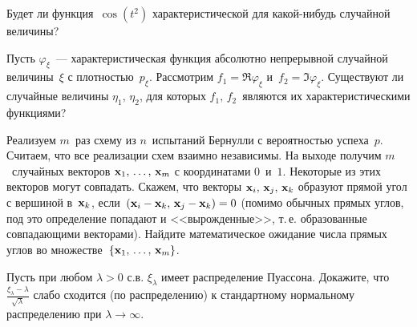 \begin{comment}
\begin{ordre}
Характеристическая функция обладает следующими свойствами:
\begin{fixme}
Iterate the properties 
\end{fixme}
\end{ordre}
\end{comment}


\begin{problem}
Будет ли функция~$\cos(t^2)$ характеристической для какой-нибудь случайной величины?
\end{problem}

\begin{problem}
Пусть $\varphi_{\xi}$~--- характеристическая функция абсолютно непрерывной случайной величины~$\xi$ с плотностью~$p_{\xi}$. Рассмотрим $f_1 = \Re \varphi_{\xi}$ и~$f_2 = \Im \varphi_{\xi} $. Существуют ли случайные величины $\eta_1,\,\eta_2$, для которых $f_1,\,f_2$~являются их характеристическими функциями? 
\end{problem}



\begin{problem}
Реализуем $m$~раз схему из $n$~испытаний Бернулли с вероятностью успеха~$p$. Считаем, что все реализации схем взаимно независимы. На выходе получим $m$~случайных векторов ${\bf x}_1,\,\dots,\,{\bf x}_m$ с координатами $0$~и~$1$. Некоторые из этих векторов могут совпадать. Скажем, что векторы ${\bf x}_i,\,{\bf x}_j,\,{\bf x}_k$ образуют прямой угол с вершиной в~${\bf x}_k$, если~$({\bf x}_i-{\bf x}_k,\,{\bf x}_j - {\bf x}_k) = 0$ (помимо обычных прямых углов, под это определение попадают и <<вырожденные>>, т.\,е. образованные совпадающими векторами). Найдите математическое ожидание числа прямых углов во множестве~$\{{\bf x}_1,\,\dots,\,{\bf x}_m\}$.
\end{problem}



\begin{problem}
Пусть при любом $\lambda >0$ с.в. $\xi _{\lambda } $ имеет распределение Пуассона. Докажите, что $\frac{\xi _{\lambda } -\lambda }{\sqrt{\lambda } } $ слабо сходится (по распределению) к стандартному нормальному распределению при $\lambda \to \infty $.

\begin{comment}
\begin{ordre}
 Используйте аппарат характеристических функций и теорему о непрерывном соответствии (о том, что слабая сходимость эквивалентна равномерной сходимости соответствующих характеристических функций).
 \end{ordre}
\end{comment}

\end{problem}


